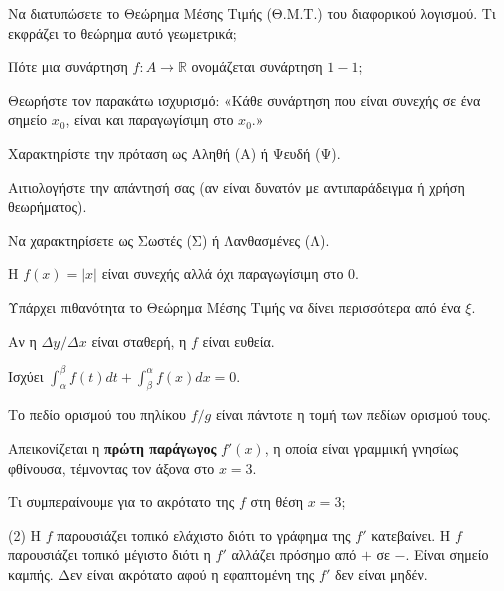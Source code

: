 \documentclass[11pt,a4paper]{article}
\newcommand{\kerkissans}[1]{{\fontfamily{maksf}\selectfont \textbf{#1}}}
\renewcommand{\textdexiakeraia}{}
\newcommand{\dint}{\displaystyle\int}
\newcommand\themanum{A}
\newcounter{thema}[section]
\renewcommand{\thethema}{\arabic{thema}}
\newcommand{\Thema}{\refstepcounter{thema}{\textbf{\textcolor{black}{\faPenSquare\ \  \large \kerkissans{\textbf{\thethemaο\hspace{2mm}Διαγώνισμα - Θέμα \themanum}}}}}\hspace{0mm}}{}
\newenvironment{thema}[1]
{\begin{tcolorbox}[title=\Thema\kerkissans{\textbf{\large{  #1}}},breakable,
enhanced standard,titlerule=0pt,toprule=0pt, rightrule=0pt, bottomrule=0pt,
colback=white,left=0mm,top=1mm,bottom=0mm,
boxrule=0pt,
colframe=white,leftrule=0mm,sharp corners,coltitle=black]
\renewcommand{\themanum}{#1}}
{\end{tcolorbox}}
\begin{document}
\begin{thema}{A}
\begin{erwthma}
    \item Να διατυπώσετε το Θεώρημα Μέσης Τιμής (Θ.Μ.Τ.) του διαφορικού λογισμού. Τι εκφράζει το θεώρημα αυτό γεωμετρικά;
    \item Πότε μια συνάρτηση $f:A\to\mathbb{R}$ ονομάζεται συνάρτηση $1-1$;
    \item Θεωρήστε τον παρακάτω ισχυρισμό:
    «Κάθε συνάρτηση που είναι συνεχής σε ένα σημείο $x_0$, είναι και παραγωγίσιμη στο $x_0$.»
    \begin{alist}
    \item Χαρακτηρίστε την πρόταση ως Αληθή (Α) ή Ψευδή (Ψ).
    \item Αιτιολογήστε την απάντησή σας (αν είναι δυνατόν με αντιπαράδειγμα ή χρήση θεωρήματος).
    \end{alist}
    \item Να χαρακτηρίσετε ως Σωστές (Σ) ή Λανθασμένες (Λ).
    \begin{alist}
        \item H $f(x)=|x|$ είναι συνεχής αλλά όχι παραγωγίσιμη στο 0.
        \item Υπάρχει πιθανότητα το Θεώρημα Μέσης Τιμής να δίνει περισσότερα από ένα $\xi$.
        \item Αν η $\Delta y / \Delta x$ είναι σταθερή, η $f$ είναι ευθεία.
        \item Ισχύει $\dint_\alpha^\beta f(t) dt + \dint_\beta^\alpha f(x) dx = 0$.
        \item Το πεδίο ορισμού του πηλίκου $f/g$ είναι πάντοτε η τομή των πεδίων ορισμού τους.
    \end{alist}
    \item Απεικονίζεται η \textbf{πρώτη παράγωγος} $f'(x)$, η οποία είναι γραμμική γνησίως φθίνουσα, τέμνοντας τον άξονα στο $x=3$.
    \begin{center}
    \end{center}
    Τι συμπεραίνουμε για το ακρότατο της $f$ στη θέση $x=3$;
    \begin{tasks}[label=\let\textdexiakeraia\relax\alph*.](2)
        \task H $f$ παρουσιάζει τοπικό ελάχιστο διότι το γράφημα της $f'$ κατεβαίνει.
        \task H $f$ παρουσιάζει τοπικό μέγιστο διότι η $f'$ αλλάζει πρόσημο από $+$ σε $-$.
        \task Είναι σημείο καμπής.
        \task Δεν είναι ακρότατο αφού η εφαπτομένη της $f'$ δεν είναι μηδέν.
    \end{tasks}
\end{erwthma}
\end{thema}
\vspace{1cm}
\end{document}
